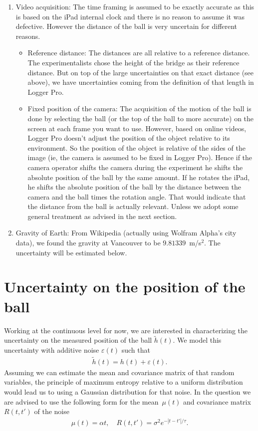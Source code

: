 \documentclass{article}
\begin{document}
\begin{enumerate}
 \item Video acquisition: The time framing is assumed to be exactly accurate as this is based on the iPad internal clock and there is no reason to assume it was defective. However the distance of the ball is very uncertain for different reasons.
\begin{itemize}
 \item Reference distance: The distances are all relative to a reference distance. The experimentalists chose the height of the bridge as their reference distance. But on top of the large uncertainties on that exact distance (see above), we have uncertainties coming from the definition of that length in Logger Pro.
 \item Fixed position of the camera: The acquisition of the motion of the ball is done by selecting the ball (or the top of the ball to more accurate) on the screen at each frame you want to use. However, based on online videos, Logger Pro doesn't adjust the position of the object relative to its environment. So the position of the object is relative of the sides of the image (ie, the camera is assumed to be fixed in Logger Pro). Hence if the camera operator shifts the camera during the experiment he shifts the absolute position of the ball by the same amount. If he rotates the iPad, he shifts the absolute position of the ball by the distance between the camera and the ball times the rotation angle. That would indicate that the distance from the ball is actually relevant. Unless we adopt some general treatment as advised in the next section.
\end{itemize}
 \item Gravity of Earth: From Wikipedia (actually using Wolfram Alpha's city data), we found the gravity at Vancouver to be $9.81339$~m/s$^2$. The uncertainty will be estimated below.
\end{enumerate}

\section{Uncertainty on the position of the ball}

Working at the continuous level for now, we are interested in characterizing the uncertainty on the measured position of the ball $\tilde{h}(t)$. 
We model this uncertainty with additive noise $\varepsilon(t)$ such that
\begin{align*}
 \tilde{h}(t) = h(t) + \varepsilon(t).
\end{align*}
Assuming we can estimate the mean and covariance matrix of that random variables, the principle of maximum entropy relative to a uniform distribution would lead us to using a Gaussian distribution for that noise.
In the question we are advised to use the following form for the mean~$\mu(t)$ and covariance matrix~$R(t,t')$ of the noise
\begin{align*}
 \mu(t) = \alpha t , \quad R(t,t') = \sigma^2 e^{-|t-t'|/\tau} .
\end{align*}
\end{document}
